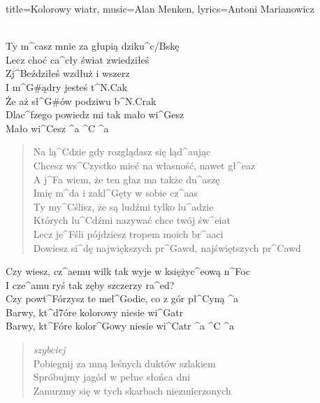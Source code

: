 \newpage
\begin{song}{title={Kolorowy wiatr}, music={Alan Menken}, lyrics={Antoni Marianowicz}}
\begin{multicols}{2}
    \begin{intro}
    	 \\
    	Ty m^{c}asz mnie za głupią dziku^{c/B}skę \\
		Lecz choć ca^{c}ły świat zwiedziłeś \\
		Zj^{B}eździłeś wzdłuż i wszerz \\
		I m^{G#}ądry jesteś t^{N.C}ak \\
		Że aż sł^{G#}ów podziwu b^{N.C}rak \\
		Dlac^{f}zego powiedz mi tak mało wi^{G}esz \\
		Mało wi^{C}esz ^{a} ^{C} ^{a}
    \end{intro}
    \begin{verse}
	    Na lą^{C}dzie gdy rozglądasz się ląd^{a}ując \\
	    Chcesz ws^{C}zystko mieć na własność, nawet gł^{e}az \\
	    A j^{F}a wiem, że ten głaz ma także du^{a}szę \\
	    Imię m^{d}a i zakl^{G}ęty w sobie cz^{a}as \\
	    Ty my^{C}ślisz, że są ludźmi tylko lu^{a}dzie \\
	    Których lu^{C}dźmi nazywać chce twój św^{e}iat \\
	    Lecz je^{F}śli pójdziesz tropem moich br^{a}aci \\
	    Dowiesz si^{d}ę największych pr^{G}awd, najświętszych pr^{C}awd
	\end{verse}
	\begin{chorus}
		Czy wiesz, cz^{a}emu wilk tak wyje w księżyc^{e}ową n^{F}oc \\
		I cze^{a}mu ryś tak zęby szczerzy ra^{e}d?  \\
		Czy powt^{F}órzysz te mel^{G}odie, co z gór pł^{C}yną ^{a} \\
		Barwy, kt^{d7}óre kolorowy niesie wi^{G}atr \\
		Barwy, kt^{F}óre kolor^{G}owy niesie wi^{C}atr ^{a} ^{C} ^{a}
	\end{chorus}
	\begin{verse}
		\textit{szybciej} \\
		Pobiegnij za mną leśnych duktów szlakiem \\
		Spróbujmy jagód w pełne słońca dni \\
		Zanurzmy się w tych skarbach niezmierzonych \\

\end{verse}
\end{multicols}
\end{song}
